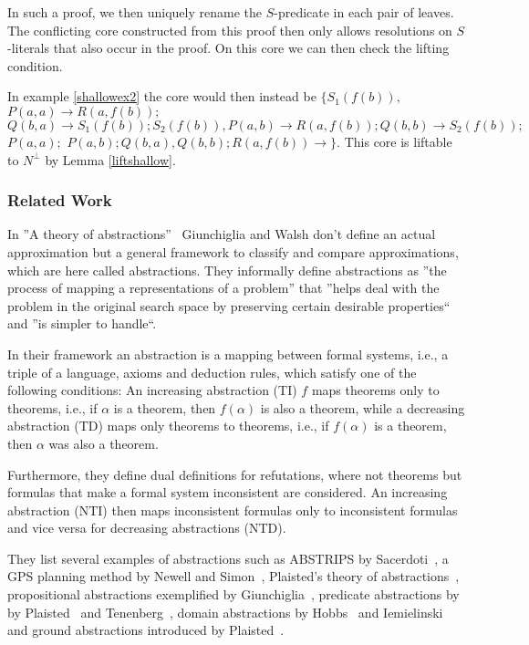 \documentclass{llncs}
\newcommand{\imp}{\rightarrow}
\begin{document}
In such a proof, we then uniquely rename the $S$-predicate in each pair of leaves.
The conflicting core constructed from this proof then only allows resolutions on $S$-literals that also occur in the proof. 
On this core we can then check the lifting condition.

In example \ref{shallowex2} the core would then instead be 
$\{ S_1(f(b)),$ $P(a,a) \imp R(a,f(b));$ $ Q(b,a) \imp S_1(f(b)); S_2(f(b)),P(a,b) \imp R(a,f(b)); Q(b,b) \imp S_2(f(b));$ $ P(a,a); $ $ P(a,b);  Q(b,a), Q(b,b);  R(a,f(b))\imp\}$.
This core is liftable to $N^\bot$ by Lemma \ref{liftshallow}.
 

\subsubsection{Related Work}
In ''A theory of abstractions''~\cite{Giunchiglia:1992:TA:146945.146951}  Giunchiglia and Walsh don't define an actual approximation but a general framework to classify and compare approximations, which are here called abstractions. 
They informally define abstractions as ''the process of mapping a representations of a problem'' that ''helps deal with the problem in the original search space by preserving certain desirable properties`` and ''is simpler to handle``. 

In their framework an abstraction is a mapping between formal systems, i.e., a triple of a language, axioms and deduction rules, which satisfy one of the following conditions:
An increasing abstraction (TI) $f$ maps theorems only to theorems, i.e., if $\alpha$ is a theorem, then $f(\alpha)$ is also a theorem, 
while a decreasing abstraction (TD)   maps only theorems to theorems, i.e., if $f(\alpha)$ is a theorem, then $\alpha$ was also a theorem.

Furthermore, they define dual definitions for refutations, where not theorems but formulas that make a formal system inconsistent  are considered.
An increasing abstraction (NTI) then maps inconsistent formulas only to inconsistent formulas and vice versa for decreasing abstractions (NTD).

They list several examples of abstractions such as  ABSTRIPS by Sacerdoti~\cite{Sacerdott:1973:PHA:1624775.1624826}, a GPS planning method by Newell and Simon~\cite{Newell:1972:HPS:1095704}, Plaisted's theory of abstractions~\cite{journals/ai/Plaisted81}, propositional abstractions exemplified by Giunchiglia~\cite{conf/ecai/GiunchigliaG88}, predicate abstractions by by Plaisted~\cite{journals/ai/Plaisted81} and Tenenberg~\cite{Tenenberg87preservingconsistency}, domain abstractions by Hobbs~\cite{Hobbs85granularity} and Iemielinski~\cite{Imielinski:1987:DAL:1625995.1626083} and ground abstractions introduced by Plaisted~\cite{journals/ai/Plaisted81}.
\end{document}
